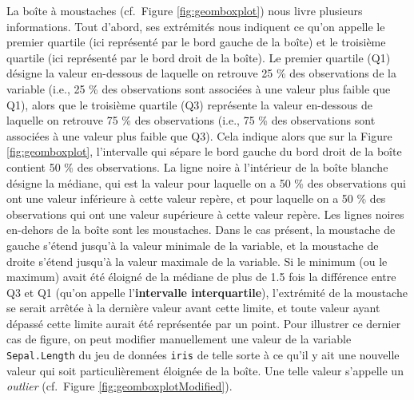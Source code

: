 \documentclass[
]{book}
\newenvironment{Shaded}{\begin{snugshade}}{\end{snugshade}}
\newcommand{\AttributeTok}[1]{\textcolor[rgb]{0.77,0.63,0.00}{#1}}
\newcommand{\CommentTok}[1]{\textcolor[rgb]{0.56,0.35,0.01}{\textit{#1}}}
\newcommand{\DecValTok}[1]{\textcolor[rgb]{0.00,0.00,0.81}{#1}}
\newcommand{\FunctionTok}[1]{\textcolor[rgb]{0.00,0.00,0.00}{#1}}
\newcommand{\NormalTok}[1]{#1}
\newcommand{\OtherTok}[1]{\textcolor[rgb]{0.56,0.35,0.01}{#1}}
\newcommand{\SpecialCharTok}[1]{\textcolor[rgb]{0.00,0.00,0.00}{#1}}
\begin{document}
La boîte à moustaches (cf.~Figure \ref{fig:geomboxplot}) nous livre plusieurs informations. Tout d'abord, ses extrémités nous indiquent ce qu'on appelle le premier quartile (ici représenté par le bord gauche de la boîte) et le troisième quartile (ici représenté par le bord droit de la boîte). Le premier quartile (Q1) désigne la valeur en-dessous de laquelle on retrouve 25 \% des observations de la variable (i.e., 25 \% des observations sont associées à une valeur plus faible que Q1), alors que le troisième quartile (Q3) représente la valeur en-dessous de laquelle on retrouve 75 \% des observations (i.e., 75 \% des observations sont associées à une valeur plus faible que Q3). Cela indique alors que sur la Figure \ref{fig:geomboxplot}, l'intervalle qui sépare le bord gauche du bord droit de la boîte contient 50 \% des observations. La ligne noire à l'intérieur de la boîte blanche désigne la médiane, qui est la valeur pour laquelle on a 50 \% des observations qui ont une valeur inférieure à cette valeur repère, et pour laquelle on a 50 \% des observations qui ont une valeur supérieure à cette valeur repère. Les lignes noires en-dehors de la boîte sont les moustaches. Dans le cas présent, la moustache de gauche s'étend jusqu'à la valeur minimale de la variable, et la moustache de droite s'étend jusqu'à la valeur maximale de la variable. Si le minimum (ou le maximum) avait été éloigné de la médiane de plus de 1.5 fois la différence entre Q3 et Q1 (qu'on appelle l'\textbf{intervalle interquartile}), l'extrémité de la moustache se serait arrêtée à la dernière valeur avant cette limite, et toute valeur ayant dépassé cette limite aurait été représentée par un point. Pour illustrer ce dernier cas de figure, on peut modifier manuellement une valeur de la variable \texttt{Sepal.Length} du jeu de données \texttt{iris} de telle sorte à ce qu'il y ait une nouvelle valeur qui soit particulièrement éloignée de la boîte. Une telle valeur s'appelle un \emph{outlier} (cf.~Figure \ref{fig:geomboxplotModified}).

\begin{Shaded}
\end{Shaded}
\end{document}
